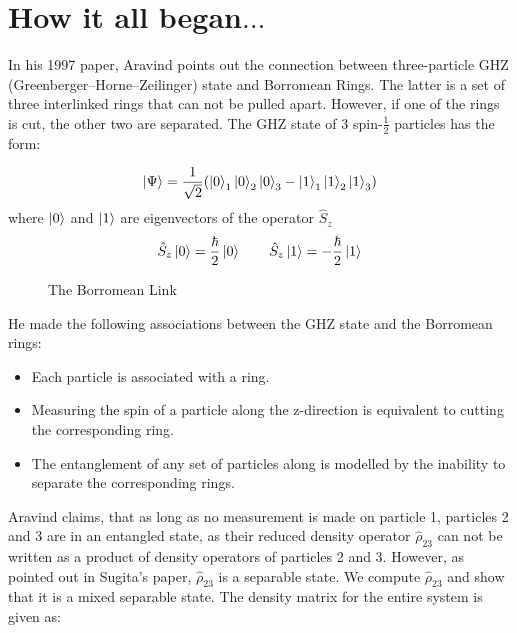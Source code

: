 \documentclass{scrartcl}
\begin{document}
\section{How it all began$\ldots$}
In his 1997 paper, Aravind points out the connection between three-particle GHZ (Greenberger–Horne–Zeilinger)
state and Borromean Rings. The latter is a set of three interlinked rings that can not be pulled apart. However, if one of the rings is cut, the other two are separated. The GHZ state of 3 spin-$\frac{1}{2}$ particles has the form:

\[
\ket{\Psi} = \frac{1}{\sqrt{2}} (\ket{0}_1\ket{0}_2\ket{0}_3 - \ket{1}_1\ket{1}_2\ket{1}_3)
\]
where $\ket{0}$ and $\ket{1}$ are eigenvectors of the operator $\hat{S}_z$
\[
\hat{S}_z\ket{0} = \frac{\hbar}{2}\ket{0}\qquad
\hat{S}_z\ket{1} = -\frac{\hbar}{2}\ket{1}
\]
\begin{figure}[H]
    \centering
   \scalebox{0.8}{ }
   \caption{The Borromean Link}
\end{figure}
\noindent
He made the following associations between the GHZ state and the Borromean rings:

\begin{itemize}
    \item Each particle is associated with a ring.
    \item Measuring the spin of a particle along the z-direction is equivalent to cutting the corresponding ring.
    \item The entanglement of any set of particles along is modelled by the inability to separate the corresponding rings.
\end{itemize}
Aravind claims, that as long as no measurement is made on particle 1, particles 2 and 3 are in an entangled state, as their reduced density operator $\hat{\rho}_{23}$ can not be written as a product of density operators of particles 2 and 3. However, as pointed out in Sugita's paper, $\hat{\rho}_{23}$ is a separable state. We compute $\hat{\rho}_{23}$ and show that it is a mixed separable state. The density matrix for the entire system is given as:
\end{document}
